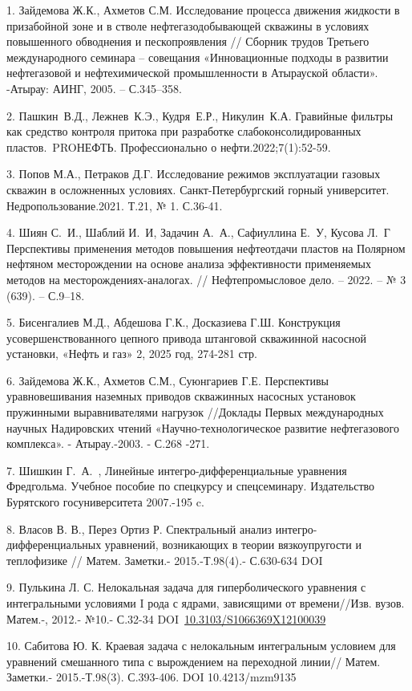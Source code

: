\begin{references}
1. Зайдемова Ж.К., Ахметов С.М. Исследование процесса движения жидкости в
призабойной зоне и в стволе нефтегазодобывающей скважины в условиях
повышенного обводнения и пескопроявления // Сборник трудов Третьего
международного семинара -- совещания «Инновационные подходы в развитии
нефтегазовой и нефтехимической промышленности в Атырауской области».
-Атырау: АИНГ, 2005. -- С.345--358.

2. Пашкин~В.Д., Лежнев~К.Э., Кудря~Е.Р., Никулин~К.А. Гравийные фильтры
как средство контроля притока при разработке слабоконсолидированных
пластов.~PROНЕФТЬ. Профессионально о нефти.2022;7(1):52-59.~

3. Попов М.А., Петраков Д.Г. Исследование режимов эксплуатации газовых
скважин в осложненных условиях. Санкт-Петербургский горный университет.
Недропользование.2021. Т.21, № 1. С.36-41.

4. Шиян С.~И., Шаблий И.~И, Задачин А.~А., Сафиуллина Е.~У, Кусова Л.~Г
Перспективы применения методов повышения нефтеотдачи пластов на Полярном
нефтяном месторождении на основе анализа эффективности применяемых
методов на месторождениях-аналогах. // Нефтепромысловое дело. -- 2022.
-- № 3 (639). -- С.9--18.

5. Бисенгалиев М.Д., Абдешова Г.К., Досказиева Г.Ш. Конструкция
усовершенствованного цепного привода штанговой скважинной насосной
установки, «Нефть и газ» 2, 2025 год, 274-281 стр.

6. Зайдемова Ж.К., Ахметов С.М., Суюнгариев Г.Е. Перспективы
уравновешивания наземных приводов скважинных насосных установок
пружинными выравнивателями нагрузок //Доклады Первых международных
научных Надировских чтений «Научно-технологическое развитие
нефтегазового комплекса». - Атырау.-2003. - С.268 -271.

7. Шишкин Г.~А.~, Линейные интегро-дифференциальные уравнения
Фредгольма. Учебное пособие по спецкурсу и спецсеминару. Издательство
Бурятского госуниверситета 2007.-195 c.

8. Власов В. В., Перез Ортиз Р. Спектральный анализ
интегро-дифференциальных уравнений, возникающих в теории вязкоупругости
и теплофизике // Матем. Заметки.- 2015.-Т.98(4).- С.630-634
DOI~\href{https://doi.org/10.4213/mzm10829}{}

9. Пулькина Л. С. Нелокальная задача для гиперболического уравнения с
интегральными условиями I рода с ядрами, зависящими от времени//Изв.
вузов. Матем.-, 2012.- №10.- С.32-34
DOI~\href{https://doi.org/10.3103/S1066369X12100039}{10.3103/S1066369X12100039}

10. Сабитова Ю. К. Краевая задача с нелокальным интегральным условием
для уравнений смешанного типа с вырождением на переходной линии// Матем.
Заметки.- 2015.-Т.98(3). С.393-406. DOI 10.4213/mzm9135
\end{references}

